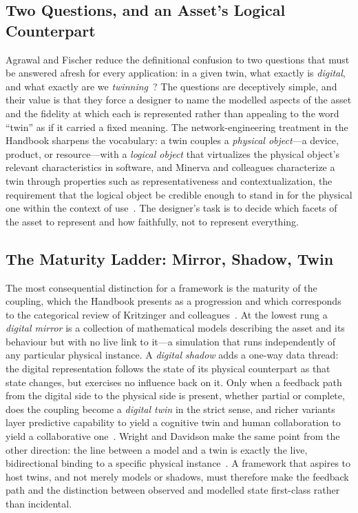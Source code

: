 \documentclass[conference]{IEEEtran}
\begin{document}
\subsection{Two Questions, and an Asset's Logical Counterpart}
Agrawal and Fischer reduce the definitional confusion to two questions that
must be answered afresh for every application: in a given twin, what exactly is
\emph{digital}, and what exactly are we \emph{twinning}~\cite{agrawal2024}? The
questions are deceptively simple, and their value is that they force a designer
to name the modelled aspects of the asset and the fidelity at which each is
represented rather than appealing to the word ``twin'' as if it carried a fixed
meaning. The network-engineering treatment in the Handbook sharpens the
vocabulary: a twin couples a \emph{physical object}---a device, product, or
resource---with a \emph{logical object} that virtualizes the physical object's
relevant characteristics in software, and Minerva and colleagues characterize a
twin through properties such as representativeness and contextualization, the
requirement that the logical object be credible enough to stand in for the
physical one within the context of use~\cite{diniz2024,minerva2020}. The
designer's task is to decide which facets of the asset to represent and how
faithfully, not to represent everything.

\subsection{The Maturity Ladder: Mirror, Shadow, Twin}
The most consequential distinction for a framework is the maturity of the
coupling, which the Handbook presents as a progression and which corresponds to
the categorical review of Kritzinger and colleagues~\cite{hamzaoui2024,kritzinger2018}.
At the lowest rung a \emph{digital mirror} is a collection of mathematical
models describing the asset and its behaviour but with no live link to it---a
simulation that runs independently of any particular physical instance. A
\emph{digital shadow} adds a one-way data thread: the digital representation
follows the state of its physical counterpart as that state changes, but
exercises no influence back on it. Only when a feedback path from the digital
side to the physical side is present, whether partial or complete, does the
coupling become a \emph{digital twin} in the strict sense, and richer variants
layer predictive capability to yield a cognitive twin and human collaboration
to yield a collaborative one~\cite{hamzaoui2024}. Wright and Davidson make the
same point from the other direction: the line between a model and a twin is
exactly the live, bidirectional binding to a specific physical
instance~\cite{wright2020}. A framework that aspires to host twins, and not
merely models or shadows, must therefore make the feedback path and the
distinction between observed and modelled state first-class rather than
incidental.
\end{document}
